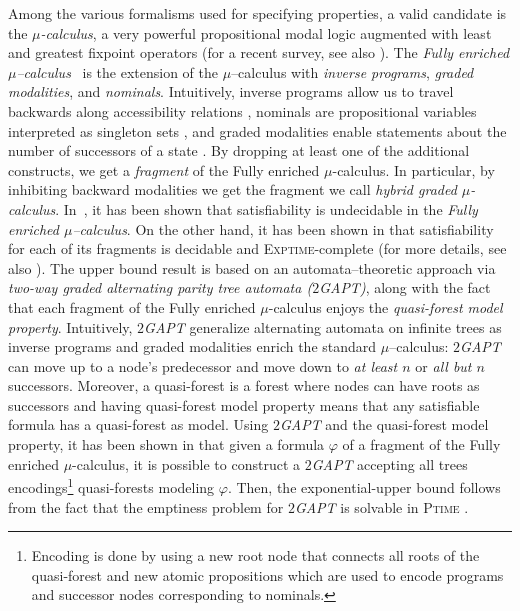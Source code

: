 \documentclass{LMCS}
\theoremstyle{plain}
\def \EXPTIME       {\textsc{Exptime}\xspace}
\def \PTIME         {\textsc{Ptime}\xspace}
\def \TGAPT         {\emph{$2$GAPT}\xspace}
\begin{document}
Among the various formalisms used for specifying properties, a valid candidate
is the \emph{$\mu$-calculus}, a very powerful propositional modal logic
augmented with least and greatest fixpoint operators \cite{Koz83} (for a recent
survey, see also \cite{BS06}). The \emph{Fully enriched
$\mu$--calculus}~\cite{BP04} is the extension of the $\mu$--calculus with
\emph{inverse programs}, \emph{graded modalities}, and \emph{nominals}.
Intuitively, inverse programs allow us to travel backwards along accessibility
relations \cite{Var98}, nominals are propositional variables interpreted as
singleton sets \cite{SV01}, and graded modalities enable statements about the
number of successors of a state \cite{KSV02}. By dropping at least one of the
additional constructs, we get a \emph{fragment} of the Fully enriched
$\mu$-calculus. In particular, by inhibiting backward modalities we get the
fragment we call \emph{hybrid graded $\mu$-calculus}. In~\cite{BP04}, it has
been shown that satisfiability is undecidable in the \emph{Fully enriched
$\mu$--calculus}. On the other hand, it has been shown in \cite{SV01,BLMV06}
that satisfiability for each of its fragments is decidable and
\EXPTIME-complete (for more details, see also \cite{BLMV08}). The upper bound
result is based on an automata--theoretic approach via \emph{two-way graded
alternating parity tree automata (\TGAPT)}, along with the fact that each
fragment of the Fully enriched $\mu$-calculus enjoys the \emph{quasi-forest
model property}. Intuitively, \TGAPT generalize alternating automata on
infinite trees as inverse programs and graded modalities enrich the standard
$\mu$--calculus: \TGAPT can move up to a node's predecessor and move down to
\emph{at least $n$} or \emph{all but $n$} successors. Moreover, a quasi-forest
is a forest where nodes can have roots as successors and having quasi-forest
model property means that any satisfiable formula has a quasi-forest as model.
Using \TGAPT and the quasi-forest model property, it has been shown in
\cite{SV01,BLMV06} that given a formula $\varphi$ of a fragment of the Fully
enriched $\mu$-calculus, it is possible to construct a \TGAPT accepting all
trees encodings\footnote{Encoding is done by using a new root node that
connects all roots of the quasi-forest and new atomic propositions which are
used to encode programs and successor nodes corresponding to nominals.}
quasi-forests modeling $\varphi$. Then, the exponential-upper bound follows
from the fact that the emptiness problem for \TGAPT is solvable in \PTIME
\cite{KPV02}.
\end{document}
